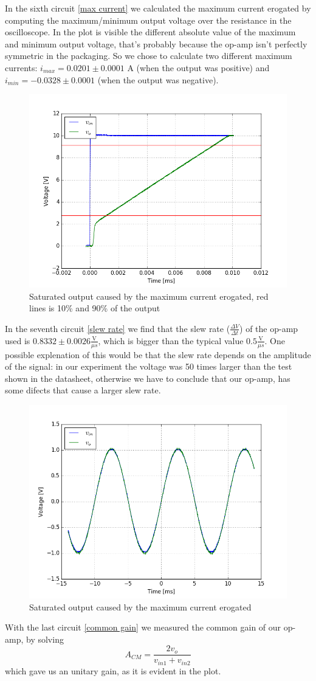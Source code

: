 In the sixth circuit \eqref{max current} we calculated the maximum current erogated by computing the maximum/minimum output voltage over the resistance in the oscilloscope. In the plot is visible the different absolute value of the maximum and minimum output voltage, that's probably because the op-amp isn't perfectly symmetric in the packaging. So we chose to calculate two different maximum currents: $i_{max} = 0.0201 \pm 0.0001$ A (when the output was positive) and $i_{min} = -0.0328 \pm 0.0001$ (when the output was negative).
\begin{figure}[H]
\centering
\includegraphics[width=.6\textwidth]{3/Slew_Ratio.png}
\caption{Saturated output caused by the maximum current erogated, red lines is 10\% and 90\% of the output}
\end{figure}
In the seventh circuit \eqref{slew rate} we find that the slew rate ($\frac{\Delta V}{\Delta t}$) of the op-amp used is $0.8332 \pm 0.0026 \frac{\text{V}}{\mu s}$, which is bigger than the typical value $0.5 \frac{\text{V}}{\mu s}$. One possible explenation of this would be that the slew rate depends on the amplitude of the signal: in our experiment the voltage was 50 times larger than the test shown in the datasheet, otherwise we have to conclude that our op-amp, has some difects that cause a larger slew rate.
\begin{figure}[H]
\centering
\includegraphics[width=.7\textwidth]{3/Amplification_in_common_mode.png}
\caption{Saturated output caused by the maximum current erogated}
\end{figure}
With the last circuit \eqref{common gain} we measured the common gain of our op-amp, by solving
\[A_{CM} = \frac{2 v_{o}}{v_{in1} + v_{in2}}\]
which gave us an unitary gain, as it is evident in the plot.
